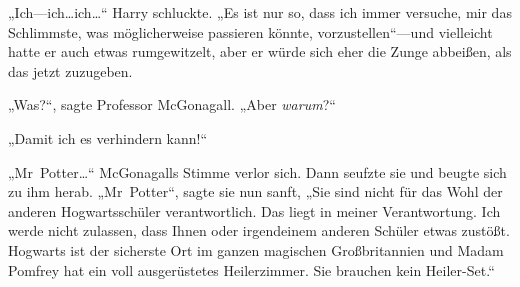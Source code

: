 
„Ich—ich…ich…“ Harry schluckte. „Es ist nur so, dass ich immer versuche, mir das Schlimmste, was möglicherweise passieren könnte, vorzustellen“—und vielleicht hatte er auch etwas rumgewitzelt, aber er würde sich eher die Zunge abbeißen, als das jetzt zuzugeben.

„Was?“, sagte Professor McGonagall. „Aber \emph{warum}?“

„Damit ich es verhindern kann!“

„Mr~Potter…“ McGonagalls Stimme verlor sich. Dann seufzte sie und beugte sich zu ihm herab. „Mr~Potter“, sagte sie nun sanft, „Sie sind nicht für das Wohl der anderen Hogwartsschüler verantwortlich. Das liegt in meiner Verantwortung. Ich werde nicht zulassen, dass Ihnen oder irgendeinem anderen Schüler etwas zustößt. Hogwarts ist der sicherste Ort im ganzen magischen Großbritannien und Madam Pomfrey hat ein voll ausgerüstetes Heilerzimmer. Sie brauchen kein Heiler-Set.“

